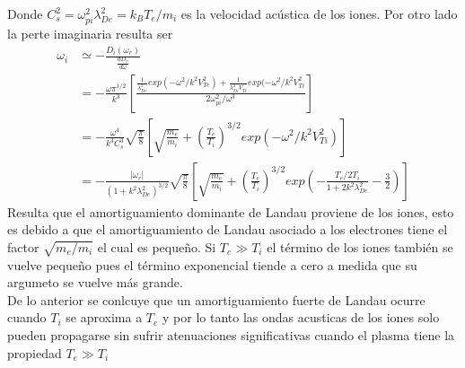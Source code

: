 \documentclass[../tesis_main_file.tex]{subfiles}
\begin{document}
Donde $C^2_s=\omega^2_{pi}\lambda^2_{De}=k_BT_e/m_i$ es la velocidad acústica de los iones. Por otro lado la perte imaginaria resulta ser
\begin{equation}
\label{eq:Amortiguamiento_Landau_ondas_iones}
\begin{split}
\omega_i &\simeq -\frac{D_i(\omega_r)}{\frac{dD_r}{d\omega}}\\
&= -\frac{\omega \pi^{1/2}}{k^3}\left[\frac{\frac{1}{\lambda^2_{De}}exp(-\omega^2/k^2V^2_{Te})+\frac{1}{\lambda^2_{Di}V_{Ti}}exp(-\omega^2 /k^2V^2_{Ti}}{2\omega^2_{pi}/\omega^3}\right]\\
&=-\frac{\omega^4}{k^3C^3_s}\sqrt{\frac{\pi}{8}}\left[\sqrt{\frac{m_e}{m_i}}+\left(\frac{T_e}{T_i}\right)^{3/2}exp(-\omega^2/k^2V^2_{Ti})\right]\\
&=-\frac{|\omega_r|}{(1+k^2\lambda^2_{De})^{3/2}}\sqrt{\frac{\pi}{8}}\left[\sqrt{\frac{m_e}{m_i}}+\left(\frac{T_e}{T_i}\right)^{3/2}exp\left(-\frac{T_e/2T_i}{1+2k^2\lambda^2_{De}}-\frac{3}{2}\right)\right]
\end{split}
\end{equation}
Resulta que el amortiguamiento dominante de Landau proviene de los iones, esto es debido a que el amortiguamiento de Landau asociado a los electrones tiene el factor $\sqrt{m_e/m_i}$ el cual es pequeño.
Si $T_e \gg T_i$ el término de los iones también se vuelve pequeño pues el término exponencial tiende a cero a medida que su argumeto se vuelve más grande.\\
De lo anterior se conlcuye que un amortiguamiento fuerte de Landau ocurre cuando $T_i$ se aproxima a $T_e$ y por lo tanto las ondas acusticas de los iones solo pueden propagarse sin sufrir atenuaciones significativas cuando el plasma tiene la propiedad $T_e \gg T_i$
\end{document}
